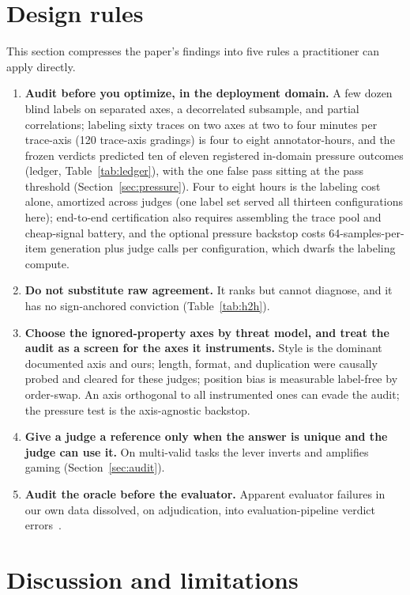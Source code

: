 \section{Design rules}
\label{sec:rules}

This section compresses the paper's findings into five rules a practitioner can apply directly.

\begin{enumerate}
\item \textbf{Audit before you optimize, in the deployment domain.}
A few dozen blind labels on separated axes, a decorrelated subsample, and partial correlations; labeling sixty traces on two axes at two to four minutes per trace-axis (120 trace-axis gradings) is four to eight annotator-hours, and the frozen verdicts predicted ten of eleven registered in-domain pressure outcomes (ledger, Table~\ref{tab:ledger}), with the one false pass sitting at the pass threshold (Section~\ref{sec:pressure}).
Four to eight hours is the labeling cost alone, amortized across judges (one label set served all thirteen configurations here); end-to-end certification also requires assembling the trace pool and cheap-signal battery, and the optional pressure backstop costs 64-samples-per-item generation plus judge calls per configuration, which dwarfs the labeling compute.
\item \textbf{Do not substitute raw agreement.}
It ranks but cannot diagnose, and it has no sign-anchored conviction (Table~\ref{tab:h2h}).
\item \textbf{Choose the ignored-property axes by threat model, and treat the audit as a screen for the axes it instruments.}
Style is the dominant documented axis and ours; length, format, and duplication were causally probed and cleared for these judges; position bias is measurable label-free by order-swap.
An axis orthogonal to all instrumented ones can evade the audit; the pressure test is the axis-agnostic backstop.
\item \textbf{Give a judge a reference only when the answer is unique and the judge can use it.}
On multi-valid tasks the lever inverts and amplifies gaming (Section~\ref{sec:audit}).
\item \textbf{Audit the oracle before the evaluator.}
Apparent evaluator failures in our own data dissolved, on adjudication, into evaluation-pipeline verdict errors~\cite{companionC}.
\end{enumerate}

\section{Discussion and limitations}
\label{sec:limits}

